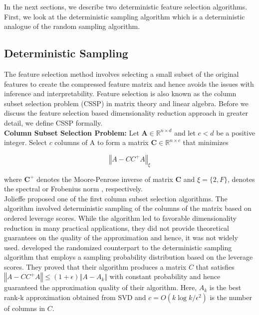 In the next sections, we describe two deterministic feature selection algorithms. First, we look at the deterministic sampling algorithm which is a deterministic analogue of the random sampling algorithm. 

\subsection{Deterministic Sampling}
\label{sec:det_sampling}

The feature selection method involves selecting a small subset of the original features to create the compressed feature matrix and hence avoids the issues with inference and  interpretability. Feature selection is also known as the column subset selection problem (CSSP) in matrix theory and linear algebra. Before we discuss the feature selection based dimensionality reduction approach in greater detail, we define CSSP formally.\\

\textbf{Column Subset Selection Problem: } Let $\boldsymbol{A} \in \boldsymbol{\mathds{R}}^{n \times d}$ and let $c < d$ be a positive integer. Select $c$ columns of A to form a matrix $\boldsymbol{C} \in \mathds{R}^{n \times c}$ that minimizes 

\begin{equation}
\left\Vert A - CC^+A \right\Vert_\xi 
\end{equation}

\noindent where $\textbf{C}^+$ denotes the Moore-Penrose inverse \cite{penrose_generalized_1955} of matrix $\textbf{C}$ and $\xi = \{2, F\}$, denotes the spectral or Frobenius norm \cite{meyer2000}, respectively. \\

Jolieffe \cite{jolliffe_discarding_1972} proposed one of the first column subset selection algorithms. The algorithm involved deterministic sampling of the columns of the matrix based on ordered leverage scores. While the algorithm led to favorable dimensionality reduction in many practical applications, they did not provide theoretical guarantees on the quality of the approximation and hence, it was not widely used. \cite{drineas_relative-error_2008} developed the randomized counterpart to the deterministic sampling algorithm that employs a sampling probability distribution based on the leverage scores. They proved that their algorithm produces a matrix $C$ that satisfies $\left\Vert A - CC^+A \right\Vert \leq (1+\epsilon) \left\Vert A - A_k \right\Vert $ with constant probability and hence guaranteed the approximation quality of their algorithm. Here, $A_k$ is the best rank-k approximation obtained from SVD and $c = O(k \log k / \epsilon^2)$ is the number of columns in $C$. \\

